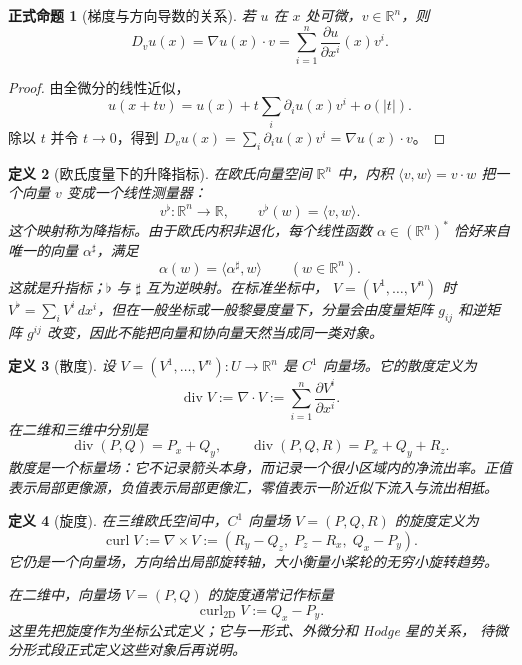 \documentclass[UTF8,fontset=none,a4paper,11pt]{ctexart}
\theoremstyle{foundation-definition}
\newtheorem{definition}{定义}[section]
\theoremstyle{foundation-theorem}
\theoremstyle{foundation-proposition}
\newtheorem{proposition}[definition]{正式命题}
\theoremstyle{foundation-example}
\theoremstyle{foundation-remark}
\theoremstyle{foundation-theorem}
\begin{document}
\begin{proposition}[梯度与方向导数的关系]\label{prop:gradient-direction-derivative}
若 \(u\) 在 \(x\) 处可微，\(v\in\mathbb R^n\)，则
\[
D_vu(x)=\nabla u(x)\cdot v
=\sum_{i=1}^n\frac{\partial u}{\partial x^i}(x)v^i.
\]
\end{proposition}

\begin{proof}
由全微分的线性近似，
\[
u(x+tv)=u(x)+t\sum_i\partial_i u(x)v^i+o(|t|).
\]
除以 \(t\) 并令 \(t\to0\)，得到
\(D_vu(x)=\sum_i\partial_i u(x)v^i=\nabla u(x)\cdot v\)。
\end{proof}

\begin{definition}[欧氏度量下的升降指标]\label{def:musical-isomorphism}
在欧氏向量空间 \(\mathbb R^n\) 中，内积 \(\langle v,w\rangle=v\cdot w\) 把一个向量
\(v\) 变成一个线性测量器：
\[
v^\flat:\mathbb R^n\to\mathbb R,\qquad
v^\flat(w)=\langle v,w\rangle.
\]
这个映射称为降指标。由于欧氏内积非退化，每个线性函数
\(\alpha\in(\mathbb R^n)^*\) 恰好来自唯一的向量 \(\alpha^\sharp\)，满足
\[
\alpha(w)=\langle\alpha^\sharp,w\rangle\qquad(w\in\mathbb R^n).
\]
这就是升指标；\(\flat\) 与 \(\sharp\) 互为逆映射。在标准坐标中，
\(V=(V^1,\ldots,V^n)\) 时 \(V^\flat=\sum_iV^i\,dx^i\)，但在一般坐标或一般黎曼度量下，分量会由度量矩阵 \(g_{ij}\) 和逆矩阵 \(g^{ij}\) 改变，因此不能把向量和协向量天然当成同一类对象。
\end{definition}

\begin{definition}[散度]\label{def:divergence}
设 \(V=(V^1,\ldots,V^n):U\to\mathbb R^n\) 是 \(C^1\) 向量场。它的散度定义为
\[
\operatorname{div}V
:=\nabla\cdot V
:=\sum_{i=1}^n\frac{\partial V^i}{\partial x^i}.
\]
在二维和三维中分别是
\[
\operatorname{div}(P,Q)=P_x+Q_y,
\qquad
\operatorname{div}(P,Q,R)=P_x+Q_y+R_z.
\]
散度是一个标量场：它不记录箭头本身，而记录一个很小区域内的净流出率。正值表示局部更像源，负值表示局部更像汇，零值表示一阶近似下流入与流出相抵。
\end{definition}

\begin{definition}[旋度]\label{def:curl}
在三维欧氏空间中，\(C^1\) 向量场 \(V=(P,Q,R)\) 的旋度定义为
\[
\operatorname{curl}V
:=\nabla\times V
:=\left(R_y-Q_z,\;P_z-R_x,\;Q_x-P_y\right).
\]
它仍是一个向量场，方向给出局部旋转轴，大小衡量小桨轮的无穷小旋转趋势。

在二维中，向量场 \(V=(P,Q)\) 的旋度通常记作标量
\[
\operatorname{curl}_{2\mathrm D}V:=Q_x-P_y.
\]
这里先把旋度作为坐标公式定义；它与一形式、外微分和 Hodge 星的关系，
待微分形式段正式定义这些对象后再说明。
\end{definition}
\end{document}

